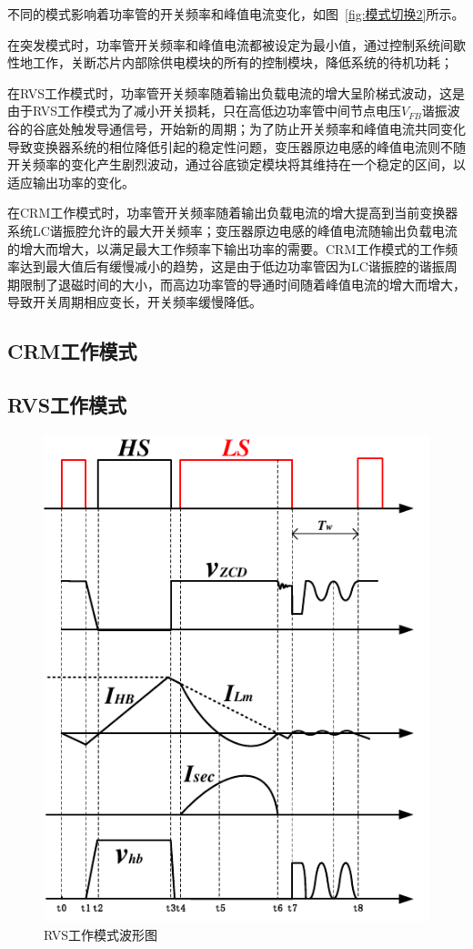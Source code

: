 不同的模式影响着功率管的开关频率和峰值电流变化，如图~\ref{fig:模式切换2}所示。

在突发模式时，功率管开关频率和峰值电流都被设定为最小值，通过控制系统间歇性地工作，关断芯片内部除供电模块的所有的控制模块，降低系统的待机功耗；

在RVS工作模式时，功率管开关频率随着输出负载电流的增大呈阶梯式波动，这是由于RVS工作模式为了减小开关损耗，只在高低边功率管中间节点电压$V_{FB}$谐振波谷的谷底处触发导通信号，开始新的周期；为了防止开关频率和峰值电流共同变化导致变换器系统的相位降低引起的稳定性问题，变压器原边电感的峰值电流则不随开关频率的变化产生剧烈波动，通过谷底锁定模块将其维持在一个稳定的区间，以适应输出功率的变化。

在CRM工作模式时，功率管开关频率随着输出负载电流的增大提高到当前变换器系统LC谐振腔允许的最大开关频率；变压器原边电感的峰值电流随输出负载电流的增大而增大，以满足最大工作频率下输出功率的需要。CRM工作模式的工作频率达到最大值后有缓慢减小的趋势，这是由于低边功率管因为LC谐振腔的谐振周期限制了退磁时间的大小，而高边功率管的导通时间随着峰值电流的增大而增大，导致开关周期相应变长，开关频率缓慢降低。

\subsection{CRM工作模式}

\subsection{RVS工作模式}

\begin{figure}[htbp] 
    \centering
    \includegraphics[width=0.6\linewidth]{figures/RVS波形图.pdf}
    \caption{RVS工作模式波形图}
    \label{fig:RVS波形图}
\end{figure}

